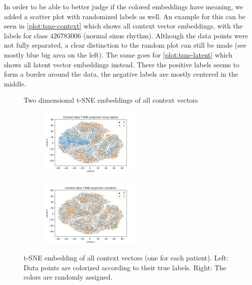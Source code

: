 In order to be able to better judge if the colored embeddings have meaning, we added a scatter plot with randomized labels as well. An example for this can be seen in \autoref{plot:tsne-context} which shows all context vector embeddings, with the labels for class $426783006$ (normal sinus rhythm). Although the data points were not fully separated, a clear distinction to the random plot can still be made (see mostly blue big area on the left). The same goes for \autoref{plot:tsne-latent} which shows all latent vector embeddings instead. There the positive labels seems to form a border around the data, the negative labels are mostly centered in the middle.
\begin{figure}[H]
	\caption{Two dimensional t-SNE embeddings of all context vectors}
	\begin{subfigure}[t]{0.48\textwidth}\centering
		\includegraphics[width=1\linewidth]{bilder/tsne-context-41.png}
		\label{fig:tsne-context-normal}	
	\end{subfigure}%
	\hfill	
	\begin{subfigure}[t]{0.48\textwidth}\centering
		\includegraphics[width=1\linewidth]{bilder/tsne-context-(random).png}		
		\label{fig:tsne-context-random}	
	\end{subfigure}
	\caption*{t-SNE embedding of all context vectors (one for each patient). Left:  Data points are colorized according to their true labels. Right: The colors are randomly assigned.}
	\label{plot:tsne-context}
\end{figure}
